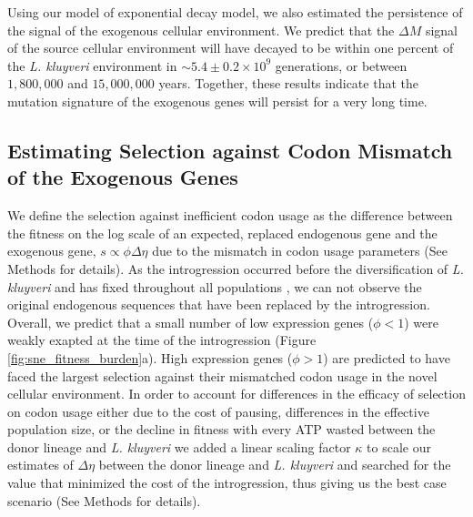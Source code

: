 \documentclass{bmcart}
\newcommand{\kluyveri}{\textit{L. kluyveri}\xspace}
\newcommand{\DM}{\ensuremath{{\Delta M}}\xspace}
\newcommand{\DE}{\ensuremath{{\Delta \eta}}\xspace}
\begin{document}
Using our model of exponential decay model, we also estimated the persistence of the signal of the exogenous cellular environment.
We predict that the \DM signal of the source cellular environment will have decayed to be within one percent of the \kluyveri environment in $\sim 5.4\pm0.2\times 10^9 $ generations, or between $1,800,000$ and $15,000,000$ years.
Together, these results indicate that the mutation signature of the exogenous genes will persist for a very long time.

\subsection*{Estimating Selection against Codon Mismatch of the Exogenous Genes}

We define the selection against inefficient codon usage as the difference between the fitness on the log scale of an expected, replaced endogenous gene and the exogenous gene, $s \propto \phi \DE$ due to the mismatch in codon usage parameters (See Methods for details).
As the introgression occurred before the diversification of \kluyveri and has fixed throughout all populations \citep{friedrich2015}, we can not observe the original endogenous sequences that have been replaced by the introgression.
Overall, we predict that a small number of low expression genes ($\phi < 1$) were weakly exapted at the time of the introgression (Figure \ref{fig:sne_fitness_burden}a).
High expression genes ($\phi > 1$) are predicted to have faced the largest selection against their mismatched codon usage in the novel cellular environment.
In order to account for differences in the efficacy of selection on codon usage either due to the cost of pausing, differences in the effective population size, or the decline in fitness with every ATP wasted between the donor lineage and \kluyveri we added a linear scaling factor $\kappa$ to scale our estimates of \DE between the donor lineage and \kluyveri and searched for the value that minimized the cost of the introgression, thus giving us the best case scenario (See Methods for details).
\end{document}
